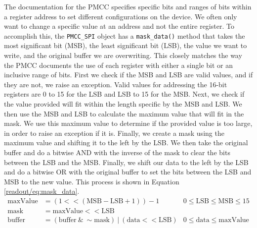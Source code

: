 The documentation for the PMCC specifies specific bits and ranges of bits within a register address to set different configurations on the device.
We often only want to change a specific value at an address and not the entire register.
To accomplish this, the \texttt{PMCC\_SPI} object has a \texttt{mask\_data()} method that takes the most significant bit (MSB), the least significant bit (LSB), the value we want to write, and the original buffer we are overwriting.
This closely matches the way the PMCC documents the use of each register with either a single bit or an inclusive range of bits. 
First we check if the MSB and LSB are valid values, and if they are not, we raise an exception.
Valid values for addressing the 16-bit registers are 0 to 15 for the LSB and LSB to 15 for the MSB.
Next, we check if the value provided will fit within the length specific by the MSB and LSB.
We then use the MSB and LSB to calculate the maximum value that will fit in the mask. 
We use this maximum value to determine if the provided value is too large, in order to raise an exception if it is.
Finally, we create a mask using the maximum value and shifting it to the left by the LSB.
We then take the original buffer and do a bitwise AND with the inverse of the mask to clear the bits between the LSB and the MSB. 
Finally, we shift our data to the left by the LSB and do a bitwise OR with the original buffer to set the bits between the LSB and MSB to the new value.
This process is shown in Equation \ref{readout/eq:mask_data}.
\begin{align}
    \label{readout/eq:mask_data}
    \text{maxValue} &= (1 << (\text{MSB} - \text{LSB} + 1)) - 1 & 0 \leq \text{LSB} \leq \text{MSB} \leq 15\\
    \text{mask} &= \text{maxValue} << \text{LSB} \\
    \text{buffer} &= (\text{buffer}\ \&\ \sim\text{mask})\ |\ (\text{data} << \text{LSB}) & 0 \leq \text{data} \leq \text{maxValue}
\end{align}

